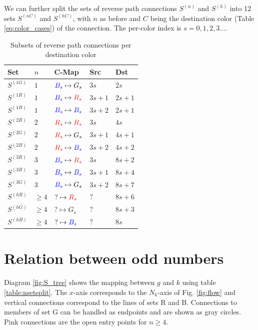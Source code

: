 \documentclass[10pt,a4paper]{article}
\begin{document}
We can further split the sets of reverse path connections $S^{(n)}$ and $S^{(h)}$ into 12 sets $S^{(nC)}$ and $S^{(hC)}$, with $n$ as before and $C$ being the destination color (Table \ref{eq:color_cases}) of the connection. The per-color index is $s=0,1,2,3\ldots$.
\begin{table}[!htbp]
\centering
\begin{tabular}{|l|l|l|l|l|}
\hline
	Set & $n$ & C-Map & Src & Dst  \\
\hline
	$S^{(1G)}$ & $1$ & $\textcolor{blue}{B_s} \mapsto G_s$ & $3s$   & $2s$   \\
	$S^{(1R)}$ & $1$ & $\textcolor{blue}{B_s} \mapsto \textcolor{red}{R_s}$ & $3s+1$ & $2s+1$ \\
	$S^{(1B)}$ & $1$ & $\textcolor{blue}{B_s} \mapsto \textcolor{blue}{B_s}$ & $3s+2$ & $2s+1$ \\
	$S^{(2R)}$ & $2$ & $\textcolor{red}{R_s} \mapsto \textcolor{red}{R_s}$ & $3s$   & $4s$   \\
	$S^{(2G)}$ & $2$ & $\textcolor{red}{R_s} \mapsto G_s$ & $3s+1$ & $4s+1$ \\
	$S^{(2B)}$ & $2$ & $\textcolor{red}{R_s} \mapsto \textcolor{blue}{B_s}$ & $3s+2$ & $4s+2$ \\
	$S^{(3R)}$ & $3$ & $\textcolor{blue}{B_s} \mapsto \textcolor{red}{R_s}$ & $3s$   & $8s+2$ \\
	$S^{(3B)}$ & $3$ & $\textcolor{blue}{B_s} \mapsto \textcolor{blue}{B_s}$ & $3s+1$ & $8s+4$ \\
	$S^{(3G)}$ & $3$ & $\textcolor{blue}{B_s} \mapsto G_s$ & $3s+2$ & $8s+7$ \\
	$S^{(hR)}$ & $\ge4$ & $?\mapsto \textcolor{red}{R_s}$ & $?$   & $8s+6$ \\
	$S^{(hG)}$ & $\ge4$ & $?\mapsto G_s$ & $?$ & $8s+3$ \\
	$S^{(hB)}$ & $\ge4$ & $?\mapsto \textcolor{blue}{B_s}$ & $?$ & $8s$ \\
\hline
\end{tabular}
	\caption{Subsets of reverse path connections per destination color}
\label{table:nsetcolorsplit}
\end{table}

\section{Relation between odd numbers}
Diagram \ref{fig:S_tree} shows the mapping between $g$ and $k$ using table \ref{table:nsetsplit}. The $x$-axis corresponds to the $N_k$-axis of Fig. \ref{fig:flow} and vertical connections correspond to the lines of sets R and B. Connections to members of set G can be handled as endpoints and are shown as gray circles. Pink connections are the open entry points for $n\ge4$.
\end{document}
